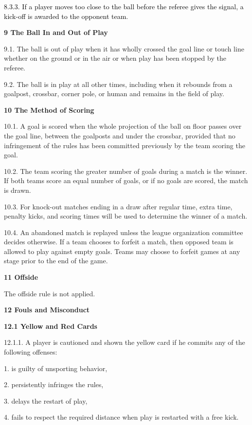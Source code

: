 \documentclass[a4paper]{article}
\begin{document}
\textcolor{black}{8.3.3. If a player moves too close to the ball before the referee gives the signal, a kick-off is
awarded to the opponent team.}


\bigskip

\textbf{9 The Ball In and Out of Play}

9.1. The ball is out of play when it has wholly crossed the goal line or touch line whether on the ground or in the air
or when play has been stopped by the referee.

9.2. The ball is in play at all other times, including when it rebounds from a goalpost, crossbar, corner pole, or human
and remains in the field of play.

\textbf{10 The Method of Scoring}

10.1. A goal is scored when the whole projection of the ball on floor passes over the goal line, between the goalposts
and under the crossbar, provided that no infringement of the rules has been committed previously by the team scoring
the goal.

10.2. The team scoring the greater number of goals during a match is the winner. If both teams score an equal number of
goals, or if no goals are scored, the match is drawn.

10.3. For knock-out matches ending in a draw after regular time, extra time, penalty kicks, and scoring times will be
used to determine the winner of a match.

10.4. An abandoned match is replayed unless the league organization committee decides otherwise. If a team chooses to
forfeit a match, then opposed team is allowed to play against empty goals. Teams may choose to forfeit games at any
stage prior to the end of the game.


\bigskip

\textbf{11 Offside}

The offside rule is not applied.

\textbf{12 Fouls and Misconduct}

\textbf{12.1 Yellow and Red Cards}

12.1.1. A player is cautioned and shown the yellow card if he commits any of the following offenses:

1. is guilty of unsporting behavior, 

2. persistently infringes the rules, 

3. delays the restart of play,

4. fails to respect the required distance when play is restarted with a free kick.
\end{document}
